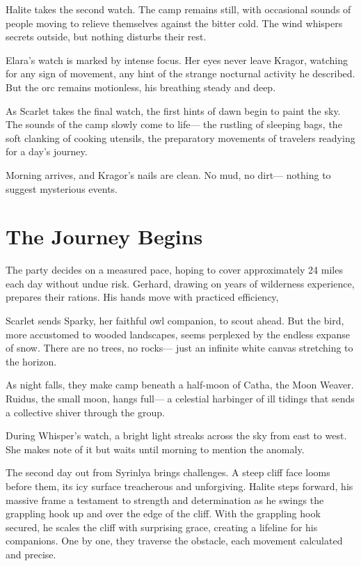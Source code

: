 \documentclass[
  letterpaper,12pt,twoside,twocolumn,openany,
  nodeprecatedcode,bg=full]{dndbook}
\begin{document}
Halite takes the second watch. The camp remains still, with occasional
sounds of people moving to relieve themselves against the bitter cold.
The wind whispers secrets outside, but nothing disturbs their rest.

Elara's watch is marked by intense focus. Her eyes never leave Kragor,
watching for any sign of movement, any hint of the strange nocturnal
activity he described. But the orc remains motionless, his breathing
steady and deep.

As Scarlet takes the final watch, the first hints of dawn begin to paint
the sky. The sounds of the camp slowly come to life--- the rustling of
sleeping bags, the soft clanking of cooking utensils, the preparatory
movements of travelers readying for a day's journey.

Morning arrives, and Kragor's nails are clean. No mud, no dirt---
nothing to suggest mysterious events.

\section{The Journey Begins}\label{the-journey-begins}

The party decides on a measured pace, hoping to cover approximately 24
miles each day without undue risk. Gerhard, drawing on years of
wilderness experience, prepares their rations. His hands move with
practiced efficiency,

Scarlet sends Sparky, her faithful owl companion, to scout ahead. But
the bird, more accustomed to wooded landscapes, seems perplexed by the
endless expanse of snow. There are no trees, no rocks--- just an
infinite white canvas stretching to the horizon.

As night falls, they make camp beneath a half-moon of Catha, the Moon
Weaver. Ruidus, the small moon, hangs full--- a celestial harbinger of
ill tidings that sends a collective shiver through the group.

During Whisper's watch, a bright light streaks across the sky from east
to west. She makes note of it but waits until morning to mention the
anomaly.

The second day out from Syrinlya brings challenges. A steep cliff face
looms before them, its icy surface treacherous and unforgiving. Halite
steps forward, his massive frame a testament to strength and
determination as he swings the grappling hook up and over the edge of
the cliff. With the grappling hook secured, he scales the cliff with
surprising grace, creating a lifeline for his companions. One by one,
they traverse the obstacle, each movement calculated and precise.
\end{document}
